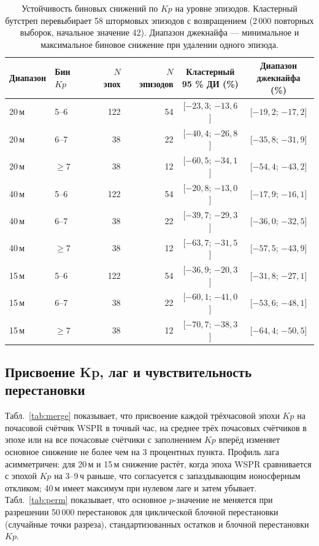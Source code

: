 \documentclass{agujournal2019}
\begin{document}
\begin{table}[h]
	\centering
	\footnotesize
	\setlength{\tabcolsep}{3pt}
	\caption{Устойчивость биновых снижений по $Kp$ на уровне эпизодов.
		Кластерный бутстреп перевыбирает 58 штормовых эпизодов
		с возвращением (2\,000 повторных выборок, начальное значение 42). Диапазон джекнайфа —
		минимальное и максимальное биновое снижение при удалении одного
		эпизода.}
	\label{tab:episode}
	\begin{tabular}{llrrcc}
		\toprule
		Диапазон & Бин $Kp$ & $N$ эпох & $N$ эпизодов
		& \shortstack[b]{Кластерный\\ 95 \% ДИ (\%)}
		& \shortstack[b]{Диапазон\\ джекнайфа (\%)} \\
		\midrule
		20\,м & 5--6 & 122 & 54 & [$-23{,}3$; $-13{,}6$] & [$-19{,}2$; $-17{,}2$] \\
		20\,м & 6--7 & 38  & 22 & [$-40{,}4$; $-26{,}8$] & [$-35{,}8$; $-31{,}9$] \\
		20\,м & $\ge 7$ & 38 & 12 & [$-60{,}5$; $-34{,}1$] & [$-54{,}4$; $-43{,}2$] \\
		40\,м & 5--6 & 122 & 54 & [$-20{,}8$; $-13{,}0$] & [$-17{,}9$; $-16{,}1$] \\
		40\,м & 6--7 & 38  & 22 & [$-39{,}7$; $-29{,}3$] & [$-36{,}0$; $-32{,}5$] \\
		40\,м & $\ge 7$ & 38 & 12 & [$-63{,}7$; $-31{,}5$] & [$-57{,}5$; $-43{,}9$] \\
		15\,м & 5--6 & 122 & 54 & [$-36{,}9$; $-20{,}3$] & [$-31{,}8$; $-27{,}1$] \\
		15\,м & 6--7 & 38  & 22 & [$-60{,}1$; $-41{,}0$] & [$-53{,}6$; $-48{,}1$] \\
		15\,м & $\ge 7$ & 38 & 12 & [$-70{,}7$; $-38{,}3$] & [$-64{,}4$; $-50{,}5$] \\
		\bottomrule
	\end{tabular}
\end{table}

\subsection{Присвоение Kp, лаг и чувствительность перестановки}

Табл.~\ref{tab:merge} показывает, что присвоение каждой трёхчасовой эпохи
$Kp$ на почасовой счётчик WSPR в точный час, на среднее трёх почасовых
счётчиков в эпохе или на все почасовые счётчики с заполнением $Kp$ вперёд
изменяет основное снижение не более чем на 3 процентных пункта. Профиль
лага асимметричен: для 20\,м и 15\,м снижение растёт, когда эпоха WSPR
сравнивается с эпохой $Kp$ на 3--9\,ч раньше, что согласуется
с запаздывающим ионосферным откликом; 40\,м имеет максимум при нулевом
лаге и затем убывает. Табл.~\ref{tab:perm} показывает, что основное
$p$-значение не меняется при разрешении 50\,000 перестановок для
циклической блочной перестановки (случайные точки разреза),
стандартизованных остатков и блочной перестановки $Kp$.
\end{document}
